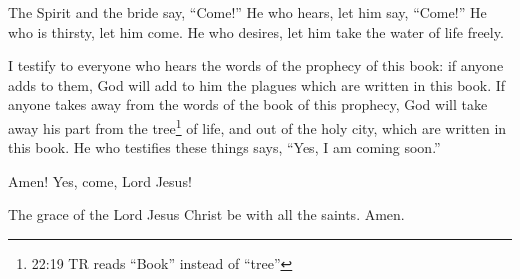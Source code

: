  The Spirit and the bride say, ``Come!'' He who hears, let
him say, ``Come!'' He who is thirsty, let him come. He who desires, let
him take the water of life freely.

 I testify to everyone who hears the words of the prophecy
of this book: if anyone adds to them, God will add to him the plagues
which are written in this book.  If anyone takes away from
the words of the book of this prophecy, God will take away his part from
the tree\footnote{22:19 TR reads ``Book'' instead of ``tree''} of life,
and out of the holy city, which are written in this book. 
He who testifies these things says, ``Yes, I am coming soon.''

Amen! Yes, come, Lord Jesus!

 The grace of the Lord Jesus Christ be with all the saints.
Amen.

